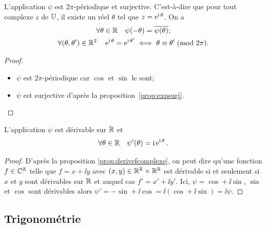 \begin{prop}
    L'application \(\psi\) est  \(2\pi\)-périodique et surjective. C'est-à-dire 
    que pour tout complexe \(z\) de \(\mathbb{U}\), il existe un réel \(\theta\) tel que 
    \(z=\operatorname{e}^{\operatorname{i} \theta}\). On a
    \begin{gather}
        \forall \theta \in \mathbb{R} \quad \psi(-\theta)=\overline{\psi(\theta)};\\
        \forall (\theta, \theta') \in \mathbb{R}^2 \quad 
        \operatorname{e}^{\operatorname{i} \theta}=\operatorname{e}^{\operatorname{i} \theta'} \iff \theta \equiv \theta'\!\pmod {2\pi}.
    \end{gather}
\end{prop}
\begin{proof}
    \begin{itemize}
        \item \(\psi\) est \(2\pi\)-périodique car \(\cos\) et \(\sin\) le sont;
        \item \(\psi\) est surjective d'après la proposition~\ref{prop:expsurj}.
    \end{itemize}
\end{proof}
\begin{prop}
    L'application \(\psi\) est dérivable sur \(\mathbb{R}\) et
    \begin{equation}
        \forall \theta \in \mathbb{R} \quad \psi'(\theta)=\operatorname{i} \operatorname{e}^{\operatorname{i} \theta}.
    \end{equation}
\end{prop}
\begin{proof}
    D'après la proposition \ref{prop:derivefcomplexe}, on peut dire qu'une 
    fonction \(f \in \mathbb{C}^{\mathbb{R}}\) telle que \(f=x+\ii y\) avec \((x,y) \in \mathbb{R}^{\mathbb{R}} 
    \times \mathbb{R}^{\mathbb{R}}\) est dérivable si et seulement si \(x\) et \(y\) sont 
    dérivables sur \(\mathbb{R}\) et auquel cas \(f'=x' +\ii y'\). Ici, \(\psi=\cos +\ii 
    \sin\), \(\sin\) et \(\cos\) sont dérivables alors \(\psi'=-\sin + \ii 
    \cos=\ii (\cos +\ii \sin)=\ii \psi\).
\end{proof}
\subsection{Trigonométrie}
\label{subsec:complexestrigo}
